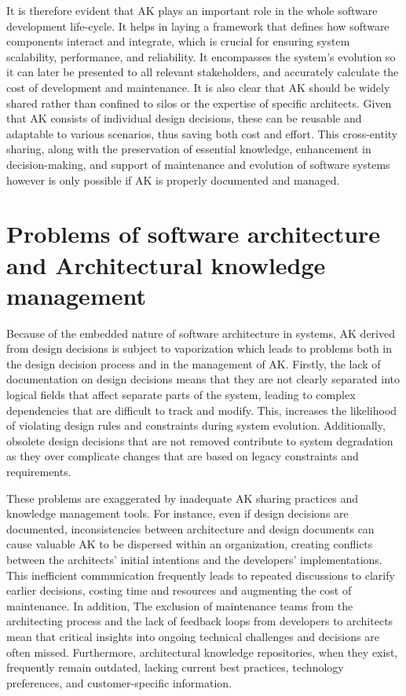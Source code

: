         It is therefore evident that AK plays an important role in the whole software development life-cycle. It helps in laying a framework that defines how software components interact and integrate, which is crucial for ensuring system scalability, performance, and reliability. It encompasses the system's evolution so it can later be presented to all relevant stakeholders, and accurately calculate the cost of development and maintenance. It is also clear that AK should be widely shared rather than confined to silos or the expertise of specific architects. Given that AK consists of individual design decisions, these can be reusable and adaptable to various scenarios, thus saving both cost and effort. This cross-entity sharing, along with the preservation of essential knowledge, enhancement in decision-making, and support of maintenance and evolution of software systems \cite{Architecture-reasoning} however is only possible if AK is properly documented and managed.

    \section{Problems of software architecture and Architectural knowledge management}
        Because of the embedded nature of software architecture in systems, AK derived from design decisions is subject to vaporization which leads to problems both in the design decision process and in the management of AK. Firstly, the lack of documentation on design decisions means that they are not clearly separated into logical fields that affect separate parts of the system, leading to complex dependencies that are difficult to track and modify. This, increases the likelihood of violating design rules and constraints during system evolution. Additionally, obsolete design decisions that are not removed contribute to system degradation as they over complicate changes that are based on legacy constraints and requirements.\cite{Arch+DesignDescisions}
        
        These problems are exaggerated by inadequate AK sharing practices and knowledge management tools. For instance, even if design decisions are documented, inconsistencies between architecture and design documents can cause valuable AK to be dispersed within an organization, creating conflicts between the architects' initial intentions and the developers' implementations. This inefficient communication frequently leads to repeated discussions to clarify earlier decisions, costing time and resources and augmenting the cost of maintenance. In addition, The exclusion of maintenance teams from the architecting process and the lack of feedback loops from developers to architects mean that critical insights into ongoing technical challenges and decisions are often missed. Furthermore, architectural knowledge repositories, when they exist, frequently remain outdated, lacking current best practices, technology preferences, and customer-specific information. \cite{ARCHITECTURAL_KNOWLEDGE_SHARING_(AKS)}
        
